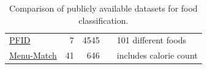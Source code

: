 \begin{table}[htbp]
\begin{tabular}{@{}lrrll@{}}
		\hyperref[subsec:relWork_Datasets_pfid]{PFID}                              & 7                                     & 4545                                   & \cite{Chen2009}                              & 101 different foods                                      \\
		
		\hyperref[subsec:relWork_Datasets_menuMatch]{Menu-Match}                              & 41                                     & 646                                   & \cite{Beijbom2015}                              & includes calorie count                                      \\
	
	\end{tabular}
	\caption{Comparison of publicly available datasets for food classification.}
	\label{tab:datasetsComparison}
\end{table}

